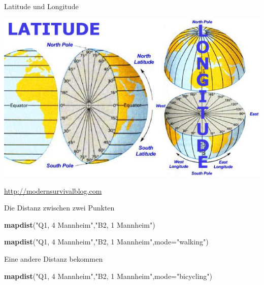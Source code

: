 \documentclass[ignorenonframetext,]{beamer}
\newenvironment{Shaded}{\begin{snugshade}}{\end{snugshade}}
\newcommand{\KeywordTok}[1]{\textcolor[rgb]{0.13,0.29,0.53}{\textbf{#1}}}
\newcommand{\DataTypeTok}[1]{\textcolor[rgb]{0.13,0.29,0.53}{#1}}
\newcommand{\StringTok}[1]{\textcolor[rgb]{0.31,0.60,0.02}{#1}}
\newcommand{\NormalTok}[1]{#1}
\begin{document}
\begin{frame}{Latitude und Longitude}

\includegraphics{figure/definition-of-latitude-longitude.jpg}

\href{http://modernsurvivalblog.com/survival-skills/basic-map-reading-latitude-longitude/}{http://modernsurvivalblog.com}

\end{frame}

\begin{frame}[fragile]{Die Distanz zwischen zwei Punkten}

\begin{Shaded}
\begin{Highlighting}[]
\KeywordTok{mapdist}\NormalTok{(}\StringTok{"Q1, 4 Mannheim"}\NormalTok{,}\StringTok{"B2, 1 Mannheim"}\NormalTok{)}
\end{Highlighting}
\end{Shaded}

\begin{Shaded}
\begin{Highlighting}[]
\KeywordTok{mapdist}\NormalTok{(}\StringTok{"Q1, 4 Mannheim"}\NormalTok{,}\StringTok{"B2, 1 Mannheim"}\NormalTok{,}\DataTypeTok{mode=}\StringTok{"walking"}\NormalTok{)}
\end{Highlighting}
\end{Shaded}

\begin{block}{Eine andere Distanz bekommen}

\begin{Shaded}
\begin{Highlighting}[]
\KeywordTok{mapdist}\NormalTok{(}\StringTok{"Q1, 4 Mannheim"}\NormalTok{,}\StringTok{"B2, 1 Mannheim"}\NormalTok{,}\DataTypeTok{mode=}\StringTok{"bicycling"}\NormalTok{)}
\end{Highlighting}
\end{Shaded}

\end{block}

\end{frame}
\end{document}
